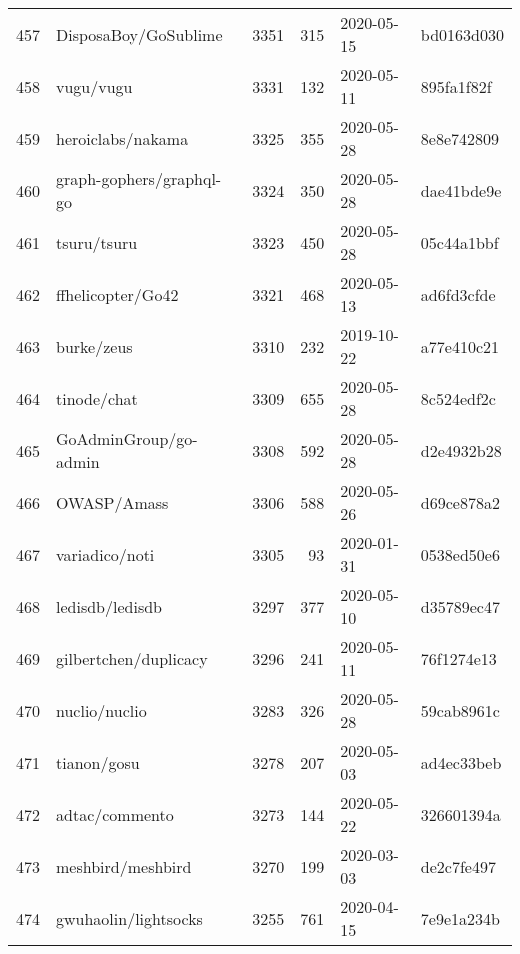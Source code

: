 \begin{longtable}{llrrll}
    457 &                               DisposaBoy/GoSublime &   3351 &    315 & 2020-05-15 &  bd0163d030 \\
    458 &                                          vugu/vugu &   3331 &    132 & 2020-05-11 &  895fa1f82f \\
    459 &                                  heroiclabs/nakama &   3325 &    355 & 2020-05-28 &  8e8e742809 \\
    460 &                           graph-gophers/graphql-go &   3324 &    350 & 2020-05-28 &  dae41bde9e \\
    461 &                                        tsuru/tsuru &   3323 &    450 & 2020-05-28 &  05c44a1bbf \\
    462 &                                  ffhelicopter/Go42 &   3321 &    468 & 2020-05-13 &  ad6fd3cfde \\
    463 &                                         burke/zeus &   3310 &    232 & 2019-10-22 &  a77e410c21 \\
    464 &                                        tinode/chat &   3309 &    655 & 2020-05-28 &  8c524edf2c \\
    465 &                              GoAdminGroup/go-admin &   3308 &    592 & 2020-05-28 &  d2e4932b28 \\
    466 &                                        OWASP/Amass &   3306 &    588 & 2020-05-26 &  d69ce878a2 \\
    467 &                                     variadico/noti &   3305 &     93 & 2020-01-31 &  0538ed50e6 \\
    468 &                                    ledisdb/ledisdb &   3297 &    377 & 2020-05-10 &  d35789ec47 \\
    469 &                              gilbertchen/duplicacy &   3296 &    241 & 2020-05-11 &  76f1274e13 \\
    470 &                                      nuclio/nuclio &   3283 &    326 & 2020-05-28 &  59cab8961c \\
    471 &                                        tianon/gosu &   3278 &    207 & 2020-05-03 &  ad4ec33beb \\
    472 &                                     adtac/commento &   3273 &    144 & 2020-05-22 &  326601394a \\
    473 &                                  meshbird/meshbird &   3270 &    199 & 2020-03-03 &  de2c7fe497 \\
    474 &                               gwuhaolin/lightsocks &   3255 &    761 & 2020-04-15 &  7e9e1a234b \\

\end{longtable}
